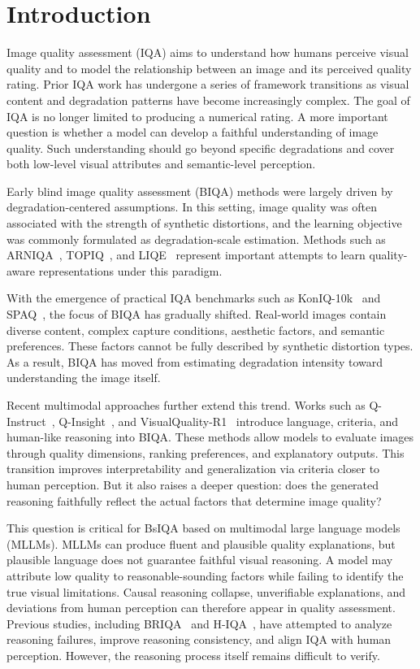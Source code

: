 \documentclass[letterpaper]{article} %
\begin{document}
\section{Introduction}

Image quality assessment (IQA) aims to understand how humans perceive visual quality and to model the relationship between an image and its perceived quality rating.
Prior IQA work has undergone a series of framework transitions as visual content and degradation patterns have become increasingly complex. The goal of IQA is no longer limited to producing a numerical rating. A more important question is whether a model can develop a faithful understanding of image quality. Such understanding should go beyond specific degradations and cover both low-level visual attributes and semantic-level perception.

Early blind image quality assessment (BIQA) methods were largely driven by degradation-centered assumptions. In this setting, image quality was often associated with the strength of synthetic distortions, and the learning objective was commonly formulated as degradation-scale estimation. Methods such as ARNIQA~\citep{arniqa}, TOPIQ~\citep{topiq}, and LIQE~\citep{liqe} represent important attempts to learn quality-aware representations under this paradigm.

With the emergence of practical IQA benchmarks such as KonIQ-10k~\citep{koniq} and SPAQ~\citep{spaq}, the focus of BIQA has gradually shifted. Real-world images contain diverse content, complex capture conditions, aesthetic factors, and semantic preferences. These factors cannot be fully described by synthetic distortion types. As a result, BIQA has moved from estimating degradation intensity toward understanding the image itself.

Recent multimodal approaches further extend this trend. Works such as Q-Instruct~\citep{q-instruct}, Q-Insight~\citep{q-insight}, and VisualQuality-R1~\citep{Visualquality-r1} introduce language, criteria, and human-like reasoning into BIQA. These methods allow models to evaluate images through quality dimensions, ranking preferences, and explanatory outputs. This transition improves interpretability and generalization via criteria closer to human perception. But it also raises a deeper question: does the generated reasoning faithfully reflect the actual factors that determine image quality?

This question is critical for BsIQA based on multimodal large language models (MLLMs). MLLMs can produce fluent and plausible quality explanations, but plausible language does not guarantee faithful visual reasoning. A model may attribute low quality to reasonable-sounding factors while failing to identify the true visual limitations. Causal reasoning collapse, unverifiable explanations, and deviations from human perception can therefore appear in quality assessment. Previous studies, including BRIQA~\citep{briqa} and H-IQA~\citep{h-iqa}, have attempted to analyze reasoning failures, improve reasoning consistency, and align IQA with human perception. However, the reasoning process itself remains difficult to verify.
\end{document}
